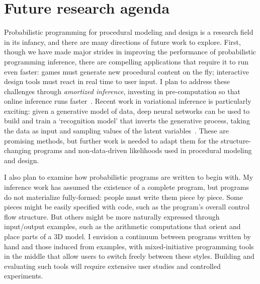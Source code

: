 \documentclass[
10pt, %
a4paper, %
oneside, %
headinclude,footinclude, %
BCOR5mm, %
]{scrartcl}
\begin{document}





\section*{Future research agenda}

Probabilistic programming for procedural modeling and design is a research field in its infancy, and there are many directions of future work to explore. First, though we have made major strides in improving the performance of probabilistic programming inference, there are compelling applications that require it to run even faster: games must generate new procedural content on the fly; interactive design tools must react in real time to user input. I plan to address these challenges through \emph{amortized inference}, investing in pre-computation so that online inference runs faster~\cite{AmortizedInference}. Recent work in variational inference is particularly exciting: given a generative model of data, deep neural networks can be used to build and train a `recognition model' that inverts the generative process, taking the data as input and sampling values of the latent variables~\cite{StochasticBackprop}. These are promising methods, but further work is needed to adapt them for the structure-changing programs and non-data-driven likelihoods used in procedural modeling and design.

I also plan to examine how probabilistic programs are written to begin with. My inference work has assumed the existence of a complete program, but programs do not materialize fully-formed: people must write them piece by piece. Some pieces might be easily specified with code, such as the program's overall control flow structure. But others might be more naturally expressed through input/output examples, such as the arithmetic computations that orient and place parts of a 3D model. I envision a continuum between programs written by hand and those induced from examples, with mixed-initiative programming tools in the middle that allow users to switch freely between these styles. Building and evaluating such tools will require extensive user studies and controlled experiments.
\end{document}
